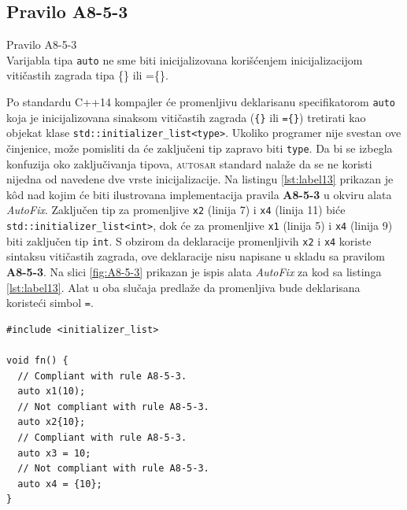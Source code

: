 \documentclass[12pt,oneside]{memoir}
\begin{document}
\subsection{Pravilo A8-5-3}
\begin{center}
\begin{tcolorbox}
Pravilo A8-5-3 \\
Varijabla tipa \texttt{auto} ne sme biti inicijalizovana kori\v{s}\'{c}enjem
inicijalizacijom viti\v{c}astih zagrada tipa \{\} ili =\{\}.
\end{tcolorbox}
\end{center}

Po standardu C++14 kompajler \'{c}e  promenljivu deklarisanu specifikatorom \texttt{auto} koja je inicijalizovana sinaksom viti\v{c}astih zagrada (\texttt{\{\}} ili \texttt{=\{\}}) tretirati kao objekat klase
\texttt{std::initializer\_list<type>}. Ukoliko programer nije svestan ove \v{c}injenice, mo\v{z}e pomisliti da \'{c}e zaklju\v{c}eni tip zapravo biti \texttt{type}. Da bi se izbegla konfuzija oko zaklju\v{c}ivanja
tipova, \textsc{autosar} standard nala\v{z}e da se ne koristi nijedna od navedene dve vrste inicijalizacije.
Na listingu \ref{lst:label13} prikazan je k\^{o}d nad kojim \'{c}e biti ilustrovana implementacija pravila \textbf{A8-5-3} u okviru alata \textit{AutoFix}. 
Zaklju\v{c}en tip za promenljive \texttt{x2} (linija 7) i \texttt{x4} (linija 11) bi\'c{e} \texttt{std::initializer\_list<int>}, dok \'{c}e za promenljive \texttt{x1} (linija 5) i \texttt{x4} (linija 9) biti zaklju\v{c}en tip \texttt{int}. S obzirom da deklaracije promenljivih \texttt{x2} i \texttt{x4} koriste sintaksu
viti\v{c}astih zagrada, ove deklaracije nisu napisane u skladu sa pravilom \textbf{A8-5-3}.
Na slici \ref{fig:A8-5-3} prikazan je ispis alata \textit{AutoFix} za kod sa listinga \ref{lst:label13}. Alat u oba slu\v{c}aja predla\v{z}e
da promenljiva bude deklarisana koriste\'{c}i simbol \texttt{=}.

\begin{lstlisting}[style=customc, caption={K\^{o}d nad kojim je demonstrirana podr\v{s}ka pravila \textbf{A8-5-3} u okviru alata \textit{AutoFix} za . Ispis alata \textit{AutoFix} nakon pokretanja nad ovim kodom prikazan je na slici \ref{fig:A8-5-3}.}, label=lst:label13]
#include <initializer_list>

void fn() {
  // Compliant with rule A8-5-3.
  auto x1(10);
  // Not compliant with rule A8-5-3.
  auto x2{10};
  // Compliant with rule A8-5-3.
  auto x3 = 10;
  // Not compliant with rule A8-5-3.
  auto x4 = {10};
}

\end{lstlisting}
\end{document}
